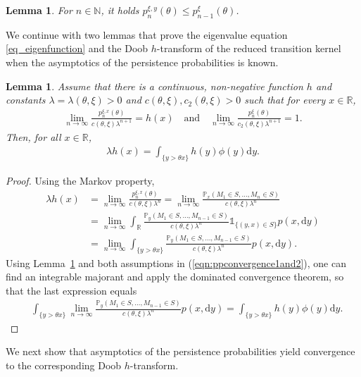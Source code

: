 \documentclass[10pt,a4paper]{amsart}
\newcommand{\N}{\mathbb{N}} %
\newcommand{\R}{\mathbb{R}} %
\renewcommand{\P}{\mathbb{P}} %
\newcommand{\1}{\mathds{1}}
\renewcommand{\d}{\mathrm{d}}
\newtheorem{Lemma}[definition]{Lemma}
\begin{document}
\begin{Lemma}\label{estimate_Px}
For $n\in\N$, it holds 
$p_n^{\xi,y}(\theta)\le p_{n-1}^{\xi}(\theta)$.
\end{Lemma}
We continue with two lemmas that prove the eigenvalue equation \eqref{eq_eigenfunction} and the Doob $h$-transform of the reduced transition kernel when the asymptotics of the persistence probabilities is known.
\begin{Lemma}\label{eigenfunction_lemma}
  Assume that there is a continuous, non-negative function $h$ and constants $\lambda=\lambda(\theta,\xi)>0$ and $c(\theta,\xi),c_2(\theta,\xi)>0$ such that for  every $x\in\R$,
    \begin{align} \label{eqn:ppconvergence1and2}
        \lim_{n\to\infty}\frac{p_n^{\xi,x}(\theta)}{c(\theta,\xi)\lambda^{n+1}}= h(x)
   \quad\text{and}\quad
       \lim_{n\to\infty}\frac{p_n^{\xi}(\theta)}{c_2(\theta,\xi)\lambda^{n+1}}=1.
    \end{align}
 Then, for all $x\in\R$,
 \begin{align*}
     \lambda h(x)=\int_{\{y>\theta x\}}h(y)\phi(y)\d y.
 \end{align*}
\end{Lemma}
\begin{proof}
Using the Markov property,
  \begin{align*}
   \lambda h(x)&= \lim_{n\to\infty}\frac{p_n^{\xi,x}(\theta)}{c(\theta,\xi)\lambda ^n}
      =\lim_{n\to\infty}\frac{\P_x(M_1\in S,\dots,M_n\in S)}{c(\theta,\xi)\lambda ^n}
      \\&=\lim_{n\to\infty}\int_\R\frac{\P_y(M_1\in S,\dots,M_{n-1}\in S)}{c(\theta,\xi)\lambda ^n}\1_{\{(y,x)\in S\}}p(x,\d y)
      \\&=\lim_{n\to\infty}\int_{\{y>\theta x\}}\frac{\P_y(M_1\in S,\dots,M_{n-1}\in S)}{c(\theta,\xi)\lambda ^n}p(x,\d y).
    \end{align*}
    Using Lemma~\ref{estimate_Px} and both assumptions in (\ref{eqn:ppconvergence1and2}), one can find an integrable majorant and apply the dominated convergence theorem, so that the last expression equals
\begin{align*}
     &%
     \int_{\{y>\theta x\}}\lim_{n\to\infty}\frac{\P_y(M_1\in S,\dots,M_{n-1}\in S)}{c(\theta,\xi)\lambda ^n}p(x,\d y)
      =\!\int_{\{y>\theta x\}} h(y)\phi(y)\d y.\tag*{\qedhere}
\end{align*}
\end{proof}
We next show that  asymptotics of the persistence probabilities yield convergence to the corresponding Doob $h$-transform.
\end{document}
